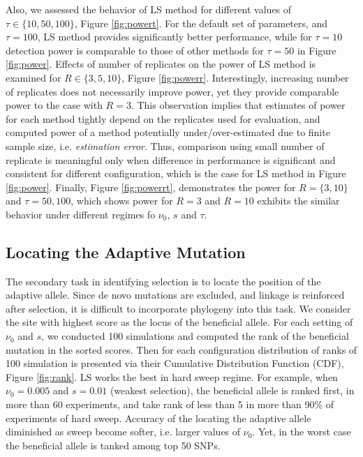 \documentclass[11pt]{article}
\begin{document}
Also, we assessed the behavior of LS method for different values of 
$\tau\in\{10,50,100\}$, 
Figure \ref{fig:powert}. For the default set of parameters, and $\tau=100$, LS 
method provides significantly better performance, while for $\tau=10$ detection 
power is comparable to those of other methods for $\tau=50$ in Figure 
\ref{fig:power}. Effects of number of replicates on the power of LS method is 
examined for $R\in\{3,5,10\}$, Figure \ref{fig:powerr}. Interestingly, 
increasing number of replicates does not necessarily improve power, yet they 
provide comparable power to the case with $R=3$. This observation implies that 
estimates of power for each method tightly depend on the replicates used for 
evaluation, and computed power of a method potentially under/over-estimated due 
to finite sample size, i.e. \emph{estimation error}. Thus, comparison using 
small number of replicate is meaningful only when difference in performance is 
significant and consistent for different configuration, which is the case for 
LS method in Figure \ref{fig:power}. Finally, Figure \ref{fig:powerrt}, 
demonstrates the power for $R=\{3,10\}$ and $\tau={50,100}$, which shows power 
for $R=3$ and $R=10$ exhibits the similar behavior under different regimes fo 
$\nu_0$, $s$ and $\tau$.

\subsection{Locating the Adaptive Mutation}
The secondary task in identifying selection is to locate the position of the 
adaptive allele. Since de novo mutations are excluded, and linkage is 
reinforced after selection, it is difficult to incorporate phylogeny into this 
task. We consider the site with highest score as the locus of the beneficial 
allele. For each setting of $\nu_0$ and $s$, we conducted 100 
simulations and computed the rank of the beneficial mutation in the sorted 
scores. Then for each configuration distribution of ranks of 100 
simulation is presented via their Cumulative Distribution Function (CDF), 
Figure \ref{fig:rank}. LS works the best in hard sweep regime. For example, 
when $\nu_0=0.005$ and $s=0.01$ (weakest selection), the beneficial allele is 
ranked first, in more than 60 experiments, and take rank of less than 5 in more 
than 90\% of experiments of hard sweep. Accuracy of the locating the adaptive 
allele diminished as sweep become softer, i.e. larger values of $\nu_0$. Yet, 
in the worst case the beneficial allele is tanked among top 50 SNPs.
\end{document}

